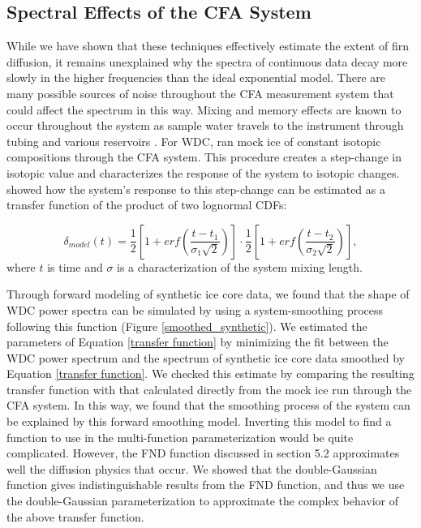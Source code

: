 \documentclass[draft, jgrga]{AGUTeX}
\begin{document}
\begin{article}
\subsection{Spectral Effects of the CFA System}
While we have shown that these techniques effectively estimate the extent of firn diffusion, it remains unexplained why the spectra of continuous data decay more slowly in the higher frequencies than the ideal exponential model. There are many possible sources of noise throughout the CFA measurement system that could affect the spectrum in this way. Mixing and memory effects are known to occur throughout the system as sample water travels to the instrument through tubing and various reservoirs \citep{Gkinis2011a}. For WDC, \citet{Jones2017b} ran mock ice of constant isotopic compositions through the CFA system. This procedure creates a step-change in isotopic value and characterizes the response of the system to isotopic changes. \citep{Jones2017b} showed how the system's response to this step-change can be estimated as a transfer function of the product of two lognormal CDFs:

\begin{equation}
  \label{transfer function}
  \delta_{model}(t) = \frac{1}{2}\left[1+erf\left(\frac{t-t_1}{\sigma_1\sqrt{2}}\right)\right] \cdot \frac{1}{2}\left[1+erf\left(\frac{t-t_2}{\sigma_2\sqrt{2}}\right)\right],
\end{equation}
where $t$ is time and $\sigma$ is a characterization of the system mixing length.

Through forward modeling of synthetic ice core data, we found that the shape of WDC power spectra can be simulated by using a system-smoothing process following this function (Figure \ref{smoothed_synthetic}). We estimated the parameters of Equation \ref{transfer function} by minimizing the fit between the WDC power spectrum and the spectrum of synthetic ice core data smoothed by Equation \ref{transfer function}. We checked this estimate by comparing the resulting transfer function with that calculated directly from the mock ice run through the CFA system. In this way, we found that the smoothing process of the system can be explained by this forward smoothing model. Inverting this model to find a function to use in the multi-function parameterization would be quite complicated. However, the FND function discussed in section 5.2 approximates well the diffusion physics that occur. We showed that the double-Gaussian function gives indistinguishable results from the FND function, and thus we use the double-Gaussian parameterization to approximate the complex behavior of the above transfer function.


\end{article}
\end{document}
